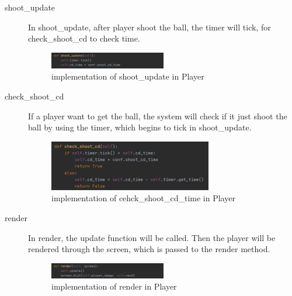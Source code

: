 \documentclass[14pt]{extarticle}
\begin{document}
\begin{description}
	\item[shoot\_update]
	In shoot\_update, after player shoot the ball, the timer will tick, for check\_shoot\_cd to check time.
	\begin{figure}[H]
		\begin{center}
			\includegraphics[width=0.5\textwidth]{Player_shoot_update}
			\caption{implementation of shoot\_update in Player}
		\end{center}
	\end{figure}
	\item[check\_shoot\_cd]
	If a player want to get the ball, the system will check if it just shoot the ball by using the timer, which begins to tick in shoot\_update.
	\begin{figure}[H]
		\begin{center}
			\includegraphics[width=0.7\textwidth]{Player_check_shoot_cd}
			\caption{implementation of cehck\_shoot\_cd\_time in Player}
		\end{center}
	\end{figure}
	\item[render]
	In render, the update function will be called. Then the player will be rendered through the screen, which is passed to the render method.
	\begin{figure}[H]
		\begin{center}
			\includegraphics[width=0.5\textwidth]{Player_render}
			\caption{implementation of render in Player}
		\end{center}
	\end{figure}
\end{description}
\end{document}
